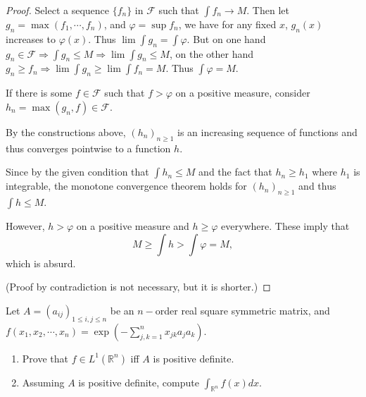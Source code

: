\begin{proof}
	Select a sequence $ \{f_{n}\} $ in $ \mathcal{F}  $ such that $ \int f_{n}\to M $. Then let $ g_{n}=\max(f_{1},\cdots,f_{n}) $, and $ \varphi=\sup f_{n} $, we have for any fixed $ x $, $ g_{n}(x) $ increases to $ \varphi(x) $. Thus $ \lim \int g_{n}=\int \varphi $. But on one hand $ g_{n}\in \mathcal{F} \Rightarrow \int g_{n}\le M \Rightarrow \lim \int g_{n} \le M $, on the other hand $ g_{n}\ge f_{n} \Rightarrow \lim \int g_{n}\ge \lim \int f_{n}=M $. Thus $ \int \varphi=M $.
	

    If there is some $ f \in \mathcal{F} $ such that $ f> \varphi $ on a positive measure, consider $ h_n=\max(g_n,f) \in \mathcal{F}$.
    
    By the constructions above, $(h_n)_{n\ge 1}$ is an increasing sequence of functions
    and thus converges pointwise to a function $h$.
    
    Since by the given condition that $ \int h_n \le M $ and the fact that $h_n\ge h_1$ where $h_1$ is integrable,
    the monotone convergence theorem holds for $(h_n)_{n\ge 1}$ and thus $ \int h \le M $.

    However, $h>\varphi$ on a positive measure and $h\ge \varphi$ everywhere. These imply that 
    $$M \ge \int h> \int \varphi =M,$$
    which is absurd.   

    (Proof by contradiction is not necessary, but it is shorter.)
\end{proof}

\begin{problem}
Let $ A=(a_{ij})_{1\le i,j\le n} $ be an $ n- $order real square symmetric matrix, and $ f( x_1,x_2,\cdots ,x_n ) =\exp \left( -\sum_{j,k=1}^n{x_{jk}a_ja_k} \right)  $.
\begin{enumerate}
\item Prove that $ f\in L^{1}(\mathbb{R} ^{n}) $ iff $ A $ is positive definite.
\item Assuming $ A $ is positive definite, compute $ \int_{\mathbb{R} ^{n}}f(x)dx $.
\end{enumerate}
\end{problem}


